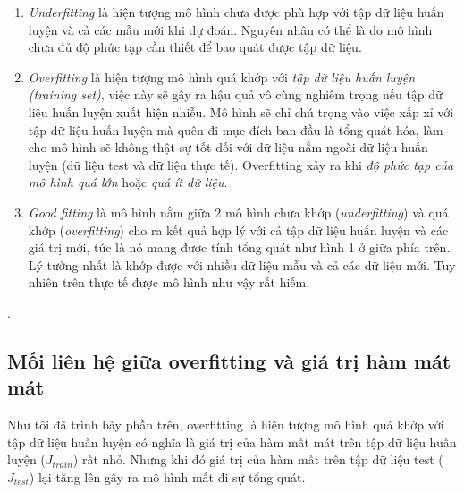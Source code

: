 \begin{enumerate}
\item
\textit{Underfitting} là hiện tượng mô hình chưa được phù hợp với tập dữ liệu huấn luyện và cả các mẫu mới khi dự đoán. Nguyên nhân có thể là do mô hình chưa đủ độ phức tạp cần thiết để bao quát được tập dữ liệu.
\item   \textit{Overfitting} là hiện tượng mô hình quá khớp với \textit{tập dữ liệu huấn luyện (training set)}, việc này sẽ gây ra hậu quả vô cùng nghiêm trọng nếu tập dữ liệu huấn luyện xuất hiện nhiễu. Mô hình sẽ chỉ chú trọng vào việc xấp xỉ với tập dữ liệu huấn luyện mà quên đi mục đích ban đầu là tổng quát hóa, làm cho mô hình sẽ không thật sự tốt dối với dữ liệu nằm ngoài dữ liệu huấn luyện (dữ liệu test và dữ liệu thực tế). Overfitting xảy ra khi \textit{độ phức tạp của mô hình quá lớn} hoặc \textit{quá ít dữ liệu}.
\item \textit{Good fitting} là mô hình nằm giữa 2 mô hình chưa khớp (\textit{underfitting}) và quá khớp (\textit{overfitting}) cho ra kết quả hợp lý với cả tập dữ liệu huấn luyện và các giá trị mới, tức là nó mang được tính tổng quát như hình 1 ở giữa phía trên. Lý tưởng nhất là khớp được với nhiều dữ liệu mẫu và cả các dữ liệu mới. Tuy nhiên trên thực tế được mô hình như vậy rất hiếm.
\end{enumerate}.
\subsection{Mối liên hệ giữa overfitting và giá trị hàm mát mát}
Như tôi đã trình bày phần trên, overfitting là hiện tượng mô hình quá khớp với tập dữ liệu huấn luyện có nghĩa là giá trị của hàm mất mát trên tập dữ liệu huấn luyện (\textit{$J_{train}$}) rất nhỏ. Nhưng khi đó giá trị của hàm mất trên tập dữ liệu test (\textit{$J_{test}$}) lại tăng lên gây ra mô hình mất đi sự tổng quát. 

